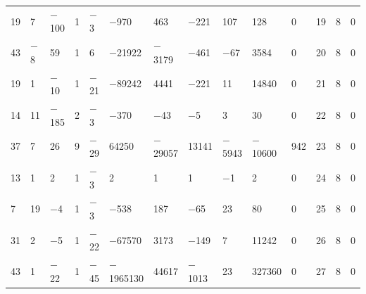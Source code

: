\documentclass[pdftex]{sigma}
\numberwithin{equation}{section}
\theoremstyle{definition}
\numberwithin{table}{section}
\begin{document}
{\begin{paracol}{3}
\begin{supertabular}{|w{c}{.32cm}w{c}{.32cm}w{c}{.32cm}@{\hspace{.5cm}}w{c}{.2cm}w{c}{.2cm}|@{\hspace{\tabcolsep}}HHHHHHw{c}{.17cm}w{c}{.17cm}w{c}{.17cm}|}
			19 & 7 & $-$100 & 1 & $-$3 & $-$970 & 463 & $-$221 & 107 & 128 & 0 & 19 & 8 & 0 \\
			43 & $-$8 & 59 & 1 & 6 & $-$21922 & $-$3179 & $-$461 & $-$67 & 3584 & 0 & 20 & 8 & 0 \\
			19 & 1 & $-$10 & 1 & $-$21 & $-$89242 & 4441 & $-$221 & 11 & 14840 & 0 & 21 & 8 & 0 \\
			14 & 11 & $-$185 & 2 & $-$3 & $-$370 & $-$43 & $-$5 & 3 & 30 & 0 & 22 & 8 & 0 \\
			37 & 7 & 26 & 9 & $-$29 & 64250 & $-$29057 & 13141 & $-$5943 & $-$10600 & 942 & 23 & 8 & 0 \\
			13 & 1 & 2 & 1 & $-$3 & 2 & 1 & 1 & $-$1 & 2 & 0 & 24 & 8 & 0 \\
			7 & 19 & $-$4 & 1 & $-$3 & $-$538 & 187 & $-$65 & 23 & 80 & 0 & 25 & 8 & 0 \\
			31 & 2 & $-$5 & 1 & $-$22 & $-$67570 & 3173 & $-$149 & 7 & 11242 & 0 & 26 & 8 & 0 \\
			43 & 1 & $-$22 & 1 & $-$45 & $-$1965130 & 44617 & $-$1013 & 23 & 327360 & 0 & 27 & 8 & 0 \\ \hline
		\end{supertabular}
		
		\switchcolumn
		

\end{paracol}}
\end{document}
